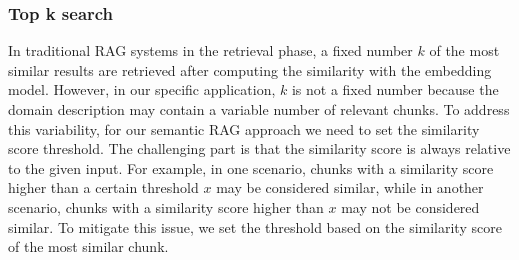 \subsubsection{Top k search}
\label{sec:top_k_search}

In traditional RAG systems in the retrieval phase, a fixed number $k$ of the most similar results are retrieved after computing the similarity with the embedding model. However, in our specific application, $k$ is not a fixed number because the domain description may contain a variable number of relevant chunks. To address this variability, for our semantic RAG approach we need to set the similarity score threshold. The challenging part is that the similarity score is always relative to the given input. For example, in one scenario, chunks with a similarity score higher than a certain threshold $x$ may be considered similar, while in another scenario, chunks with a similarity score higher than $x$ may not be considered similar. To mitigate this issue, we set the threshold based on the similarity score of the most similar chunk.